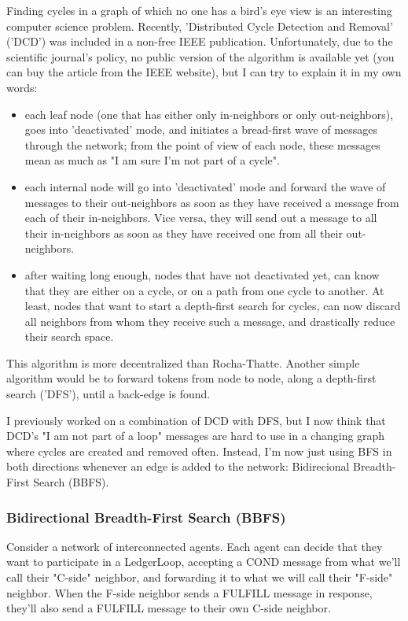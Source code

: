 \documentclass[11pt,twoside,a4paper]{article}
\begin{document}
Finding cycles in a graph of which no one has a bird's eye view is an interesting computer science problem. Recently, 'Distributed Cycle Detection and Removal' ~\cite{Oliva2016} ('DCD') was included in a non-free IEEE publication. Unfortunately, due to the scientific journal's policy, no public version of the algorithm is available yet (you can buy the article from the IEEE website), but I can try to explain it in my own words:

\begin{itemize}
\item each leaf node (one that has either only in-neighbors or only out-neighbors), goes into 'deactivated' mode, and initiates a bread-first wave of messages through the network; from the point of view of each node, these messages mean as much as "I am sure I'm not part of a cycle".
\item each internal node will go into 'deactivated' mode and forward the wave of messages to their out-neighbors as soon as they have received a message from each of their in-neighbors. Vice versa, they will send out a message to all their in-neighbors as soon as they have received one from all their out-neighbors.
\item after waiting long enough, nodes that have not deactivated yet, can know that they are either on a cycle, or on a path from one cycle to another. At least, nodes that want to start a depth-first search for cycles, can now discard all neighbors from whom they receive such a message, and drastically reduce their search space.
\end{itemize}

This algorithm is more decentralized than Rocha-Thatte. Another simple algorithm would be to forward tokens from node to node, along a depth-first search ('DFS'), until a back-edge is found.

I previously worked on a combination of DCD with DFS, but I now think that DCD's "I am not part of a loop" messages are hard to use in a changing graph where cycles are created and removed often. Instead, I'm now just using BFS in both directions whenever an edge is added to the network: Bidirecional Breadth-First Search (BBFS).

\subsubsection{Bidirectional Breadth-First Search (BBFS)}
Consider a network of interconnected agents. Each agent can decide that they want to participate in a LedgerLoop, accepting a COND message from what we'll call their "C-side" neighbor, and forwarding it to what we will call their "F-side" neighbor. When the F-side neighbor sends a FULFILL message in response, they'll also send a FULFILL message to their own C-side neighbor.
\end{document}
